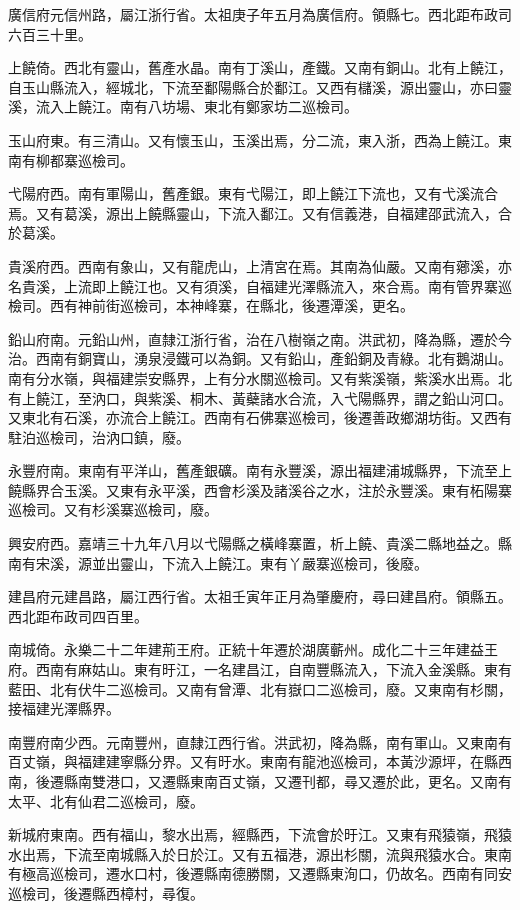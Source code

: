 廣信府元信州路，屬江浙行省。太祖庚子年五月為廣信府。領縣七。西北距布政司六百三十里。

上饒倚。西北有靈山，舊產水晶。南有丁溪山，產鐵。又南有銅山。北有上饒江，自玉山縣流入，經城北，下流至鄱陽縣合於鄱江。又西有櫧溪，源出靈山，亦曰靈溪，流入上饒江。南有八坊場、東北有鄭家坊二巡檢司。

玉山府東。有三清山。又有懷玉山，玉溪出焉，分二流，東入浙，西為上饒江。東南有柳都寨巡檢司。

弋陽府西。南有軍陽山，舊產銀。東有弋陽江，即上饒江下流也，又有弋溪流合焉。又有葛溪，源出上饒縣靈山，下流入鄱江。又有信義港，自福建邵武流入，合於葛溪。

貴溪府西。西南有象山，又有龍虎山，上清宮在焉。其南為仙嚴。又南有薌溪，亦名貴溪，上流即上饒江也。又有須溪，自福建光澤縣流入，來合焉。南有管界寨巡檢司。西有神前街巡檢司，本神峰寨，在縣北，後遷潭溪，更名。

鉛山府南。元鉛山州，直隸江浙行省，治在八樹嶺之南。洪武初，降為縣，遷於今治。西南有銅寶山，湧泉浸鐵可以為銅。又有鉛山，產鉛銅及青綠。北有鵝湖山。南有分水嶺，與福建崇安縣界，上有分水關巡檢司。又有紫溪嶺，紫溪水出焉。北有上饒江，至汭口，與紫溪、桐木、黃蘗諸水合流，入弋陽縣界，謂之鉛山河口。又東北有石溪，亦流合上饒江。西南有石佛寨巡檢司，後遷善政鄉湖坊街。又西有駐泊巡檢司，治汭口鎮，廢。

永豐府南。東南有平洋山，舊產銀礦。南有永豐溪，源出福建浦城縣界，下流至上饒縣界合玉溪。又東有永平溪，西會杉溪及諸溪谷之水，注於永豐溪。東有柘陽寨巡檢司。又有杉溪寨巡檢司，廢。

興安府西。嘉靖三十九年八月以弋陽縣之橫峰寨置，析上饒、貴溪二縣地益之。縣南有宋溪，源並出靈山，下流入上饒江。東有丫嚴寨巡檢司，後廢。

建昌府元建昌路，屬江西行省。太祖壬寅年正月為肇慶府，尋曰建昌府。領縣五。西北距布政司四百里。

南城倚。永樂二十二年建荊王府。正統十年遷於湖廣蘄州。成化二十三年建益王府。西南有麻姑山。東有旴江，一名建昌江，自南豐縣流入，下流入金溪縣。東有藍田、北有伏牛二巡檢司。又南有曾潭、北有嶽口二巡檢司，廢。又東南有杉關，接福建光澤縣界。

南豐府南少西。元南豐州，直隸江西行省。洪武初，降為縣，南有軍山。又東南有百丈嶺，與福建建寧縣分界。又有旴水。東南有龍池巡檢司，本黃沙源坪，在縣西南，後遷縣南雙港口，又遷縣東南百丈嶺，又遷刊都，尋又遷於此，更名。又南有太平、北有仙君二巡檢司，廢。

新城府東南。西有福山，黎水出焉，經縣西，下流會於旴江。又東有飛猿嶺，飛猿水出焉，下流至南城縣入於日於江。又有五福港，源出杉關，流與飛猿水合。東南有極高巡檢司，遷水口村，後遷縣南德勝關，又遷縣東洵口，仍故名。西南有同安巡檢司，後遷縣西樟村，尋復。

